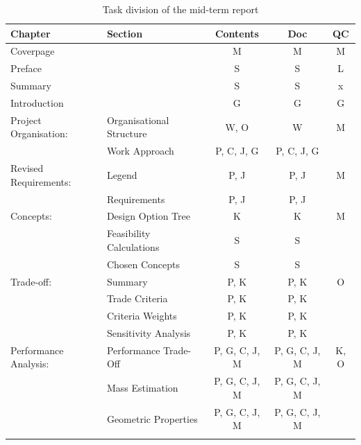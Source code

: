 

\begin{longtable}[htb]{p{4cm}p{3cm}ccc}
    \caption{Task division of the mid-term report}\label{tab:taskdivi}\\
    \toprule
    \textbf{Chapter}  & \textbf{Section} & \textbf{Contents}  & \textbf{Doc}  & \textbf{QC} \\ \midrule
    Coverpage     &        & M                   &  M                 & M                 \\ \hdashline
    Preface       &        & S                   &  S                 & L                    \\ \hdashline
    Summary       &        & S                   &  S                 & x                \\ \hdashline
    Introduction  &        & G                   &  G                 & G                    \\ \hdashline
    Project Organisation:  & Organisational Structure & W, O        & W     &  M                 \\ \hdashline
        &  Work Approach     & P, C, J, G        & P, C, J, G &               \\ \hdashline
    Revised Requirements: & Legend        & P, J     & P, J     &  M              \\ \hdashline
        &  Requirements      & P, J     & P, J     &           \\ \hdashline
    Concepts:   &  Design Option Tree & K          & K              & M \\ \hdashline
        & Feasibility Calculations & S   & S &  \\ \hdashline
        & Chosen Concepts & S & S &  \\ \hdashline
    Trade-off:  & Summary & P, K & P, K & O \\ \hdashline 
        & Trade Criteria & P, K & P, K &  \\ \hdashline
        & Criteria Weights & P, K & P, K & \\ \hdashline
        & Sensitivity Analysis &P, K & P, K & \\ \hdashline
    Performance Analysis: & Performance Trade-Off & P, G, C, J, M & P, G, C, J, M & K, O \\ \hdashline
        & Mass Estimation & P, G, C, J, M & P, G, C, J, M &  \\ \hdashline
        & Geometric Properties & P, G, C, J, M & P, G, C, J, M & \\ \hdashline

\end{longtable}

